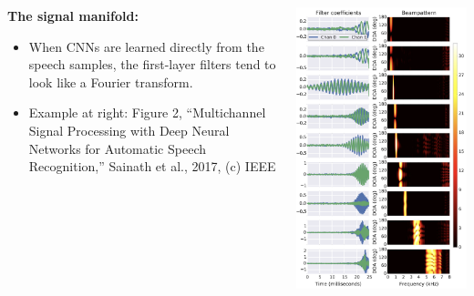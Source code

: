 \documentclass{beamer}
\begin{document}
\begin{frame}
  \begin{columns}
    \begin{column}{0.5\textwidth}
      {\bf The signal manifold:}
      \begin{itemize}
      \item When CNNs are learned directly from the speech samples,
        the first-layer filters tend to look like a Fourier transform.
      \item Example at right: Figure 2, ``Multichannel Signal
        Processing with Deep Neural Networks for Automatic Speech
        Recognition,'' Sainath et al., 2017, (c) IEEE
      \end{itemize}
    \end{column}
    \begin{column}{0.5\textwidth}
      \includegraphics[height=\textheight]{figs/sainath2017fig2.png}
    \end{column}
  \end{columns}
\end{frame}
\end{document}
